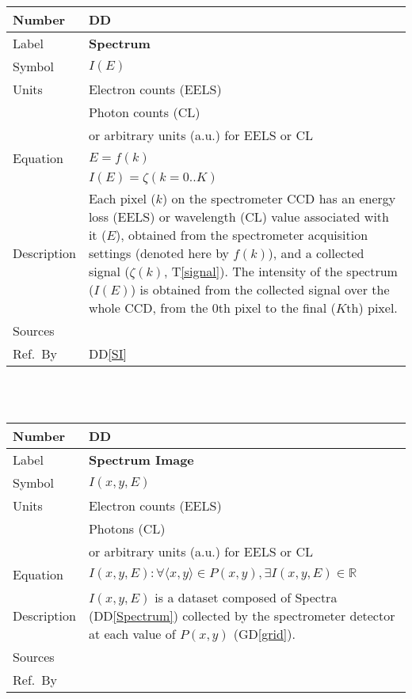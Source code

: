 \documentclass[12pt]{article}
\newcommand{\colAwidth}{0.13\textwidth}
\newcommand{\colBwidth}{0.82\textwidth}
\newcounter{defnum} %
\newcommand{\dref}[1]{GD\ref{#1}}
\newcounter{datadefnum} %
\newcommand{\ddref}[1]{DD\ref{#1}}
\newcommand{\tref}[1]{T\ref{#1}}
\begin{document}
\noindent
\begin{minipage}{\textwidth}
	\renewcommand*{\arraystretch}{1.5}
	\begin{tabular}{| p{\colAwidth} | p{\colBwidth}|}
		\hline
		\rowcolor[gray]{0.9}
		Number& DD{datadefnum}\thedatadefnum \label{Spectrum}\\
		\hline
		Label& \bf Spectrum\\
		\hline
		Symbol & $I(E)$\\
		\hline
		Units & Electron counts (EELS)\\
		& Photon counts (CL)\\
		& or arbitrary units (a.u.) for EELS or CL\\
		  \hline
		  Equation & $E = f(k)$\\
		  & $I(E) = \zeta(k=0..K)$\\
		  \hline
		  Description & Each pixel ($k$) on the spectrometer CCD has an energy loss (EELS) or wavelength (CL) value associated with it ($E$), obtained from the spectrometer acquisition settings (denoted here by $f(k)$), and a collected signal ($\zeta(k)$, \tref{signal}). The intensity of the spectrum ($I(E)$) is obtained from the collected signal over the whole CCD, from the 0th pixel to the final ($K$th) pixel.\\
		  \hline
		  Sources & \cite{egerton_introduction_2011} \\
		  \hline
		  Ref.\ By & \ddref{SI}\\
		  \hline
	\end{tabular}
\end{minipage}\\

~\newline

\noindent
\begin{minipage}{\textwidth}
\renewcommand*{\arraystretch}{1.5}
\begin{tabular}{| p{\colAwidth} | p{\colBwidth}|}
	\hline
	\rowcolor[gray]{0.9}
	Number& DD{datadefnum}\thedatadefnum \label{SI}\\
	\hline
	Label& \bf Spectrum Image\\
	\hline
	Symbol &$I(x, y, E)$\\
	\hline
	Units & Electron counts (EELS)\\
	& Photons (CL)\\
	& or arbitrary units (a.u.) for EELS or CL\\
	\hline
	Equation& $I(x, y, E): \forall \langle x, y \rangle \in P(x,y), \exists I(x,y,E) \in \mathbb{R}$\\
	\hline
	Description & $I(x, y, E)$ is a dataset composed of Spectra (\ddref{Spectrum}) collected by the spectrometer detector at each value of $P(x,y)$ (\dref{grid}).
	\\
	\hline
	Sources&~\cite{jeanguillaume_spectrum-image:_1989}  \\
	\hline
	Ref.\ By & \\
	\hline
\end{tabular}
\end{minipage}\\
\end{document}
